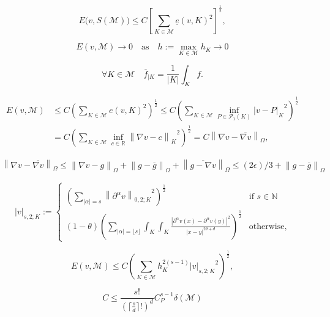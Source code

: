 \documentclass[a4paper]{article}
\begin{document}
\[
 E\big( v,{S}({\mathcal{M}}) \big)
 \leq
 C \left[
  \sum_{{K}\in{\mathcal{M}}} {\underline{e}}(v,{K})^2
 \right]^{\frac12},
\]

\[
  E(v,{\mathcal{M}}) \to 0
  \quad\text{as}\quad
  h {:=} \max_{{K}\in{\mathcal{M}}} h_{K} \to 0
 \]

\[
 \forall{K}\in{\mathcal{M}}
 \quad
 \overline f_{|{K}} = \frac1{{\left|{K}\right|}} \int_{K} f.
\]

\begin{equation}\label{mv-bd}\begin{aligned}
 E(v,{\mathcal{M}}) 
 &\leq
 C \left( \sum_{{K}\in{\mathcal{M}}} e(v,{K})^2 \right)^{\frac12}
 \leq
 C \left(
  \sum_{{K}\in{\mathcal{M}}} \inf_{P\in{\mathcal{P}_{1}({{K}})}} {\left|{v-P}\right|_{K}}^2
 \right)^{\frac12}
\\
 &=
 C \left(
  \sum_{{K}\in{\mathcal{M}}} \inf_{c\in{\mathbb{R}}} {\left\|{{\nabla} v - c}\right\|_{K}}^2
 \right)^{\frac12}
 =
 C {\left\|{{\nabla} v - \overline{{\nabla} v}}\right\|_{{\Omega}}},
\end{aligned}\end{equation}

\begin{multline*}
 {\left\|{{\nabla} v - \overline{{\nabla} v}}\right\|_{{\Omega}}}
 \leq
 {\left\|{{\nabla} v - g}\right\|_{{\Omega}}}
  + {\left\|{g - \overline g}\right\|_{{\Omega}}}
  + {\left\|{\overline{g-{\nabla} v}}\right\|_{{\Omega}}}
 \leq
 (2{\epsilon})/3 + {\left\|{g - \overline g}\right\|_{{\Omega}}}
\end{multline*}

\begin{equation*}
 {{\left|{{v}}\right|_{{{s},{2};{K}}}}}
 {:=}
 \begin{cases}
  \left(
   \sum_{|\alpha|=s} {{\left\|{{\partial^\alpha v}}\right\|_{{0,{2};{K}}}}}^2
  \right)^{\frac12}
  & \text{if }s\in{\mathbb{N}}
\\
  (1-\theta)\left(
    \sum_{|\alpha|=\lfloor s\rfloor} \displaystyle
     \int_{K}\int_{K}
     \frac{|\partial^\alpha v(x) - \partial^\alpha v(y)|^2}{|x-y|^{2\theta+d}}
    \right)^{\frac12}
  & \text{otherwise,}
 \end{cases} 
\end{equation*}

\[
 E(v,{\mathcal{M}})
 \leq
 C \left(
   \sum_{{K}\in{\mathcal{M}}} h_{K}^{2(s-1)} {{\left|{{v}}\right|_{{{s},{2};{K}}}}}^2
 \right)^{\frac12},
\]

\[
 C \leq \frac{s!}{(\lceil\frac{s}{d}\rceil!)^d} C_P^{s-1}\delta({\mathcal{M}})
\]
\end{document}
